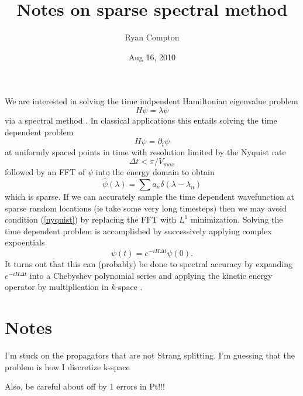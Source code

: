 \documentclass[12pt]{amsart}
\title{Notes on sparse spectral method}
\author{Ryan Compton}
\date{Aug 16, 2010}
\theoremstyle{remark}
\begin{document}
\maketitle

We are interested in solving the time indpendent Hamiltonian eigenvalue problem
\begin{equation}
H\psi = \lambda \psi
\end{equation}
via a spectral method \cite{FEIT1982}. In classical applications this entails solving the time dependent problem
\begin{equation}
H\psi = \partial_t \psi
\end{equation}
at uniformly spaced points in time with resolution limited by the Nyquist rate
\begin{equation}\label{nyquist}
\Delta t < \pi / V_{max}
\end{equation}
followed by an FFT of $\psi$ into the energy domain to obtain
\begin{equation}
\hat{\psi}(\lambda) = \sum a_n \delta(\lambda - \lambda_n)
\end{equation}
which is sparse. If we can accurately sample the time dependent wavefunction at sparse random locations (ie take some very long timesteps) then we may avoid condition (\ref{nyquist}) by replacing the FFT with $L^1$ minimization. Solving the time dependent problem is accomplished by successively applying complex expoentials
\begin{equation}
\psi(t) = e^{-iH\Delta t}\psi(0).
\end{equation}
It turns out that this can (probably) be done to spectral accuracy by expanding $e^{-iH\Delta t}$ into a Chebyshev polynomial series and applying the kinetic energy operator by multiplication in $k$-space \cite{Fritz1983} \cite{Fritz1983}.

\section{Notes}

I'm stuck on the propagators that are not Strang splitting. I'm guessing that the problem is how I discretize k-space

Also, be careful about off by 1 errors in Pt!!!



\end{document}
